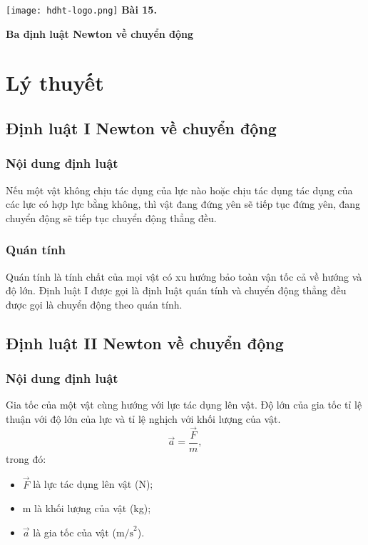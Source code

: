 \newcommand{\chapter}[2][]{
	\newcommand{\chapname}{#2}
	\begin{flushleft}
		\begin{minipage}[t]{\linewidth}
			\texttt{[image: hdht-logo.png]}
			\hspace{0pt}	
			\sffamily\bfseries\large Bài  15.
			\begin{flushleft}
				\huge\bfseries #1
			\end{flushleft}
		\end{minipage}
	\end{flushleft}
	\vspace{1cm}
	\normalfont\normalsize
}
\chapter[Ba định luật Newton về chuyển động]{Ba định luật Newton về chuyển động}
\section{Lý thuyết}

\subsection{Định luật I Newton về chuyển động}
\subsubsection{Nội dung định luật}
Nếu một vật không chịu tác dụng của lực nào hoặc chịu tác dụng tác dụng của các lực có hợp lực bằng không, thì vật đang đứng yên sẽ tiếp tục đứng yên, đang chuyển động sẽ tiếp tục chuyển động thẳng đều.
\subsubsection{Quán tính}
Quán tính là tính chất của mọi vật có xu hướng bảo toàn vận tốc cả về hướng và độ lớn.
Định luật I được gọi là định luật quán tính và chuyển động thẳng đều được gọi là chuyển động theo quán tính.
\subsection{Định luật II Newton về chuyển động}
\subsubsection{Nội dung định luật}
Gia tốc của một vật cùng hướng với lực tác dụng lên vật. Độ lớn của gia tốc tỉ lệ thuận với độ lớn của lực và tỉ lệ nghịch với khối lượng của vật.
\begin{equation*}
	\vec{a}=\dfrac{\vec F}{m},
\end{equation*}
trong đó:
\begin{itemize}
	\item $\vec F$ là lực tác dụng lên vật (N);
	\item m là khối lượng của vật (kg);
	\item $\vec a$ là gia tốc của vật ($\text{m/s}^2$).
\end{itemize}

